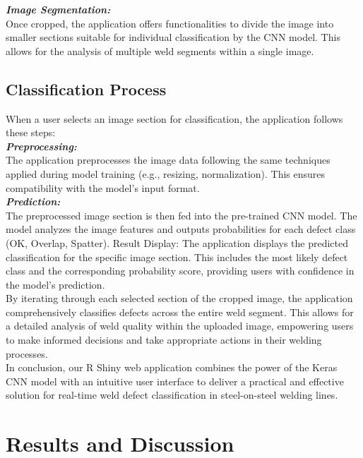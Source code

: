 \documentclass{article_saj}
\begin{document}
    \indent \textbf{\textit{Image Segmentation:}}\\ \indent Once cropped, the application offers functionalities to divide the image into smaller sections suitable for individual classification by the CNN model. This allows for the analysis of multiple weld segments within a single image.\\

\subsection{Classification Process}
\indent
\indent When a user selects an image section for classification, the application follows these steps:\\

    \indent \textbf{\textit{Preprocessing:}}\\ \indent The application preprocesses the image data following the same techniques applied during model training (e.g., resizing, normalization). This ensures compatibility with the model's input format. \\
    
    \indent \textit{\textbf{Prediction:}} \\ \indent The preprocessed image section is then fed into the pre-trained CNN model. The model analyzes the image features and outputs probabilities for each defect class (OK, Overlap, Spatter).
    Result Display: The application displays the predicted classification for the specific image section. This includes the most likely defect class and the corresponding probability score, providing users with confidence in the model's prediction.\\

\indent By iterating through each selected section of the cropped image, the application comprehensively classifies defects across the entire weld segment. This allows for a detailed analysis of weld quality within the uploaded image, empowering users to make informed decisions and take appropriate actions in their welding processes.\\

\indent In conclusion, our R Shiny web application combines the power of the Keras CNN model with an intuitive user interface to deliver a practical and effective solution for real-time weld defect classification in steel-on-steel welding lines.


\section{Results and Discussion}
\end{document}
